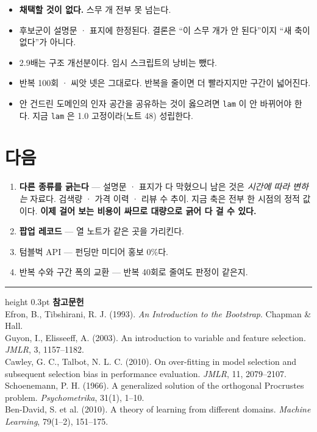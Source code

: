\documentclass[10pt]{article}
\begin{document}
\begin{itemize}[leftmargin=1.1em,itemsep=0.15em]
\item \textbf{채택할 것이 없다.} 스무 개 전부 못 넘는다.
\item 후보군이 설명문 · 표지에 한정된다. 결론은 ``이 스무 개가 안 된다''이지
      ``새 축이 없다''가 아니다.
\item 2.9배는 구조 개선분이다. 임시 스크립트의 낭비는 뺐다.
\item 반복 100회 · 씨앗 넷은 그대로다. 반복을 줄이면 더 빨라지지만 구간이
      넓어진다.
\item 안 건드린 도메인의 인자 공간을 공유하는 것이 옳으려면 \texttt{lam}
      이 안 바뀌어야 한다. 지금 \texttt{lam} 은 1.0 고정이라(노트 48) 성립한다.
\end{itemize}

\section{다음}

\begin{enumerate}[leftmargin=1.3em,itemsep=0.15em]
\item \textbf{다른 종류를 긁는다} --- 설명문 · 표지가 다 막혔으니 남은 것은
      \emph{시간에 따라 변하는} 자료다. 검색량 · 가격 이력 · 리뷰 수 추이.
      지금 축은 전부 한 시점의 정적 값이다. \textbf{이제 걸어 보는 비용이
      싸므로 대량으로 긁어 다 걸 수 있다.}
\item \textbf{팝업 레코드} --- 열 노트가 같은 곳을 가리킨다.
\item 텀블벅 API --- 펀딩만 미디어 홍보 0\%다.
\item 반복 수와 구간 폭의 교환 --- 반복 40회로 줄여도 판정이 같은지.
\end{enumerate}

\vspace{0.6em}
\hrule height 0.3pt
\vspace{0.5em}
{\footnotesize
\textbf{참고문헌}\\[0.3em]
Efron, B., Tibshirani, R. J. (1993). \emph{An Introduction to the Bootstrap}.
Chapman \& Hall.\\[0.15em]
Guyon, I., Elisseeff, A. (2003). An introduction to variable and feature
selection. \emph{JMLR}, 3, 1157--1182.\\[0.15em]
Cawley, G. C., Talbot, N. L. C. (2010). On over-fitting in model selection and
subsequent selection bias in performance evaluation. \emph{JMLR}, 11, 2079--2107.\\[0.15em]
Schoenemann, P. H. (1966). A generalized solution of the orthogonal Procrustes
problem. \emph{Psychometrika}, 31(1), 1--10.\\[0.15em]
Ben-David, S. et al. (2010). A theory of learning from different domains.
\emph{Machine Learning}, 79(1--2), 151--175.
}
\end{document}
